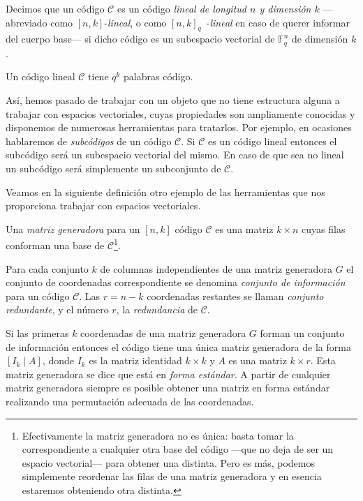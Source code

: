 \begin{definition}
  Decimos que un código \(\mathcal C\) es un código \textit{lineal de longitud \(n\) y dimensión \(k\)} —abreviado como \([n, k]\)-\textit{lineal}, o como \([n, k]_q\)~-\textit{lineal} en caso de querer informar del cuerpo base— si dicho código es un subespacio vectorial de \(\mathbb F_q^n\) de dimensión \(k\).
\end{definition}

\begin{remark}
  Un código lineal \(\mathcal C\) tiene \(q^k\) palabras código.
\end{remark}

Así, hemos pasado de trabajar con un objeto que no tiene estructura alguna a trabajar con espacios vectoriales, cuyas propiedades son ampliamente conocidas y disponemos de numerosas herramientas para tratarlos.
Por ejemplo, en ocasiones hablaremos de \emph{subcódigos} de un código \(\mathcal C\).
Si \(\mathcal C\) es un código lineal entonces el subcódigo será un subespacio vectorial del mismo.
En caso de que sea no lineal un subcódigo será simplemente un subconjunto de \(\mathcal C\).

Veamos en la siguiente definición otro ejemplo de las herramientas que nos proporciona trabajar con espacios vectoriales.

\begin{definition}
  Una \textit{matriz generadora} para un \([n, k]\) código \(\mathcal C\) es una matriz \(k \times n\) cuyas filas conforman una base de \(\mathcal C\)\footnote{Efectivamente la matriz generadora no es única: basta tomar la correspondiente a cualquier otra base del código —que no deja de ser un espacio vectorial— para obtener una distinta. Pero es más, podemos simplemente reordenar las filas de una matriz generadora y en esencia estaremos obteniendo otra distinta.}.
\end{definition}



\begin{definition}
  Para cada conjunto \(k\) de columnas independientes de una matriz generadora \(G\) el conjunto de coordenadas correspondiente se denomina \textit{conjunto de información} para un código \(\mathcal C\). 
  Las \(r = n - k\) coordenadas restantes se llaman \textit{conjunto redundante}, y el número \(r\), la \textit{redundancia} de \(\mathcal C\).
\end{definition}

Si las primeras \(k\) coordenadas de una matriz generadora \(G\) forman un conjunto de información entonces el código tiene una única matriz generadora de la forma \([I_k \mid A]\), donde \(I_k\) es la matriz identidad \(k \times k\) y \(A\) es una matriz \(k \times r\). 
Esta matriz generadora se dice que está en \textit{forma estándar}.
A partir de cualquier matriz generadora siempre es posible obtener una matriz en forma estándar realizando una permutación adecuada de las coordenadas.

